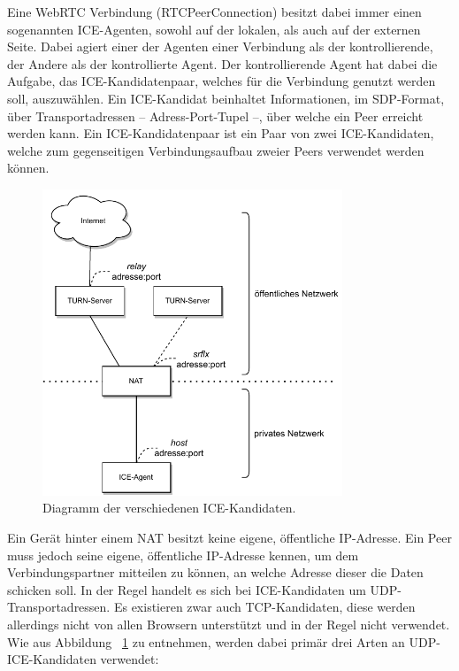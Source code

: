 Eine \acs{WebRTC} Verbindung (RTCPeerConnection) besitzt dabei immer einen sogenannten \acs{ICE}-Agenten, sowohl auf der lokalen, als auch auf der externen Seite. Dabei agiert einer der Agenten einer Verbindung als der kontrollierende, der Andere als der kontrollierte Agent. Der kontrollierende Agent hat dabei die Aufgabe, das \acs{ICE}-Kandidatenpaar, welches für die Verbindung genutzt werden soll, auszuwählen. Ein \acs{ICE}-Kandidat beinhaltet Informationen, im \acs{SDP}-Format, über Transportadressen -- Adress-Port-Tupel --, über welche ein Peer erreicht werden kann. Ein \acs{ICE}-Kandidatenpaar ist ein Paar von zwei \acs{ICE}-Kandidaten, welche zum gegenseitigen Verbindungsaufbau zweier Peers verwendet werden können.

\begin{figure}[h]
\centering
\includegraphics[width=0.80\textwidth]{bilder/PDF_SVG/CANDIDATES_OLD.pdf}
\caption{Diagramm der verschiedenen \acs{ICE}-Kandidaten.}
\label{fig:icecandidates}
\end{figure}

Ein Gerät hinter einem \acs{NAT} besitzt keine eigene, öffentliche \acs{IP}-Adresse. Ein Peer muss jedoch seine eigene, öffentliche \acs{IP}-Adresse kennen, um dem Verbindungspartner mitteilen zu können, an welche Adresse dieser die Daten schicken soll. In der Regel handelt es sich bei  \acs{ICE}-Kandidaten um \acs{UDP}-Transportadressen. Es existieren zwar auch \acs{TCP}-Kandidaten, diese werden allerdings nicht von allen Browsern unterstützt und in der Regel nicht verwendet. Wie aus Abbildung ~\ref{fig:icecandidates} zu entnehmen, werden dabei primär drei Arten an \acs{UDP}-\acs{ICE}-Kandidaten verwendet:

